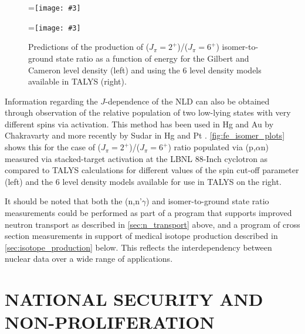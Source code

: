 \documentclass[letterpaper,draft]{ar-1col}
\newcommand{\subfigimg}[4][,]{%
  \setbox1=\hbox{\noindent\texttt{[image: \#3]}}%
  \leavevmode\rlap{\usebox1}%
  \rlap{\hspace*{#4pt}\raisebox{\dimexpr\ht1-2\baselineskip}{#2}}%
  \phantom{\usebox1}%
}
\begin{document}
\begin{figure}
    \centering
        \centering
        \hspace{-5pt}\subfigimg[width=0.5\textwidth]{}{isomer_curves.pdf}{50}
   \hspace{-5pt}%
        \centering
        \subfigimg[width=0.5\textwidth]{}{ldmodels.pdf}{50}
   \hspace{-5pt}%
    \caption{Predictions of the production of ($J_\pi=2^+$)/($J_\pi=6^+$) isomer-to-ground state ratio as a function of energy for the Gilbert and Cameron level density (left) and using the 6 level density models available in TALYS (right). }
     \label{fig:fe_isomer_plots}
\end{figure}

Information regarding the $J$-dependence of the NLD can also be obtained through observation of the relative population of two low-lying states with very different spins via activation.  This method has been used in Hg and Au by Chakravarty \cite{PhysRevC.45.1171} and more recently by Sudar in Hg and Pt \cite{PhysRevC.73.034613}.  \autoref{fig:fe_isomer_plots} shows this for the case of ($J_\pi=2^+$)/($J_\pi=6^+$) ratio populated via (p,$\alpha$n) measured via stacked-target activation at the LBNL 88-Inch cyclotron as compared to TALYS calculations for different values of the spin cut-off parameter (left) and the 6 level density models available for use in TALYS on the right.  


It should be noted that both the (n,n'$\gamma$) and isomer-to-ground state ratio measurements could be performed as part of a program that supports improved neutron transport as described in \autoref{sec:n_transport} above, and a program of cross section measurements in support of medical isotope production described in \autoref{sec:isotope_production} below.  This reflects the interdependency between nuclear data over a wide range of applications.  


\section{NATIONAL SECURITY AND NON-PROLIFERATION}
\end{document}
